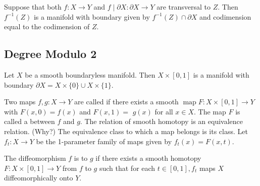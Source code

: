 \begin{theorem}
    Suppose that both $f: X \rightarrow Y$ and $f \mid \partial X: \partial X \rightarrow Y$ are transversal to $Z$. Then $f^{-1}(Z)$ is a manifold with boundary given by $f^{-1}(Z) \cap \partial X$ and codimension equal to the codimension of $Z$.
\end{theorem}

\subsection{Degree Modulo 2}

Let $X$ be a smooth boundaryless manifold. Then $X \times[0,1]$ is a manifold with boundary $\partial X=X \times\{0\} \cup X \times\{1\}$.

\begin{definition}
    Two maps $f, g: X \rightarrow Y$ are called  if there exists a smooth $\operatorname{map} F: X \times[0,1] \rightarrow Y$ with $F(x, 0)=f(x)$ and $F(x, 1)=$ $g(x)$ for all $x \in X$. The map $F$ is called a  between $f$ and $g$. The relation of smooth homotopy is an equivalence relation. (Why?) The equivalence class to which a map belongs is its  class. Let $f_{t}: X \rightarrow Y$ be the 1-parameter family of maps given by $f_{t}(x)=F(x, t)$.
\end{definition}

\begin{definition}
    The diffeomorphism $f$ is  to $g$ if there exists a smooth homotopy $F: X \times[0,1] \rightarrow Y$ from $f$ to $g$ such that for each $t \in[0,1], f_{t}$ maps $X$ diffeomorphically onto $Y$.
\end{definition}

